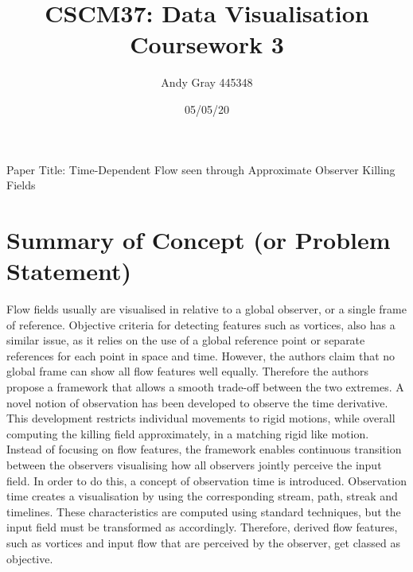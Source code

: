 \documentclass[a4paper,9pt]{article}
\begin{document}
\title{\textbf{CSCM37: Data Visualisation \\Coursework 3}}
\author{Andy Gray 445348\\}
\date{05/05/20}

\renewcommand\maketitlehookc{\vspace{-12ex}}

\maketitle

Paper Title: Time-Dependent Flow seen through Approximate Observer Killing Fields

\section{Summary of Concept (or Problem Statement)}

Flow fields usually are visualised in relative to a global observer, or a single frame of reference. Objective criteria for detecting features such as vortices, also has a similar issue, as it relies on the use of a global reference point or separate references for each point in space and time. However, the authors claim that no global frame can show all flow features well equally. Therefore the authors propose a framework that allows a smooth trade-off between the two extremes. A novel notion of observation has been developed to observe the time derivative. This development restricts individual movements to rigid motions, while overall computing the killing field approximately, in a matching rigid like motion. Instead of focusing on flow features, the framework enables continuous transition between the observers visualising how all observers jointly perceive the input field. In order to do this, a concept of observation time is introduced. Observation time creates a visualisation by using the corresponding stream, path, streak and timelines. These characteristics are computed using standard techniques, but the input field must be transformed as accordingly. Therefore, derived flow features, such as vortices and input flow that are perceived by the observer, get classed as objective. 
\end{document}
